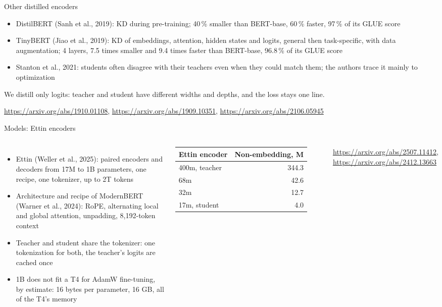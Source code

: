 \documentclass[aspectratio=169,11pt]{beamer}
\begin{document}
\begin{frame}{Other distilled encoders}
  \begin{itemize}
    \item DistilBERT (Sanh et al., 2019): KD during pre-training; 40\,\% smaller than BERT-base, 60\,\% faster, 97\,\% of its GLUE score
    \item TinyBERT (Jiao et al., 2019): KD of embeddings, attention, hidden states and logits, general then task-specific, with data augmentation; 4 layers, 7.5 times smaller and 9.4 times faster than BERT-base, 96.8\,\% of its GLUE score
    \item Stanton et al., 2021: students often disagree with their teachers even when they could match them; the authors trace it mainly to optimization
  \end{itemize}
  \medskip
  We distill only logits: teacher and student have different widths and depths, and the loss stays one line.

  \medskip
  \footnotesize \url{https://arxiv.org/abs/1910.01108}, \url{https://arxiv.org/abs/1909.10351}, \url{https://arxiv.org/abs/2106.05945}
\end{frame}

\begin{frame}{Models: Ettin encoders}
  \begin{columns}[T]
    \begin{itemize}
      \item Ettin (Weller et al., 2025): paired encoders and decoders from 17M to 1B parameters, one recipe, one tokenizer, up to 2T tokens
      \item Architecture and recipe of ModernBERT (Warner et al., 2024): RoPE, alternating local and global attention, unpadding, 8,192-token context
      \item Teacher and student share the tokenizer: one tokenization for both, the teacher's logits are cached once
      \item 1B does not fit a T4 for AdamW fine-tuning, by estimate: 16 bytes per parameter, 16 GB, all of the T4's memory
    \end{itemize}
    \small
    \begin{tabular}{lr}
      \toprule
      Ettin encoder & Non-embedding, M \\
      \midrule
      400m, teacher & 344.3 \\
      68m & 42.6 \\
      32m & 12.7 \\
      17m, student & 4.0 \\
      \bottomrule
    \end{tabular}

    \footnotesize \url{https://arxiv.org/abs/2507.11412}, \url{https://arxiv.org/abs/2412.13663}
  \end{columns}
\end{frame}
\end{document}
